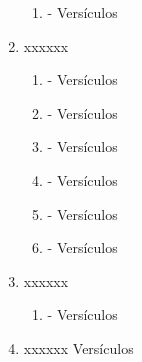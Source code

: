 \documentclass[9pt,letterpaper]{article}
\begin{document}
\begin{enumerate}
\begin{enumerate}
			\item  - Versículos 
		\end{enumerate}
		\item xxxxxx
		\begin{enumerate}
			\item  - Versículos  
			\item  - Versículos 
			\item  - Versículos 
			\item  - Versículos 
			\item  - Versículos 
			\item  - Versículos 
		\end{enumerate}
		\item xxxxxx
		\begin{enumerate}
			\item  - Versículos 
		\end{enumerate}
		\item xxxxxx Versículos 
	\end{enumerate}
\end{document}

